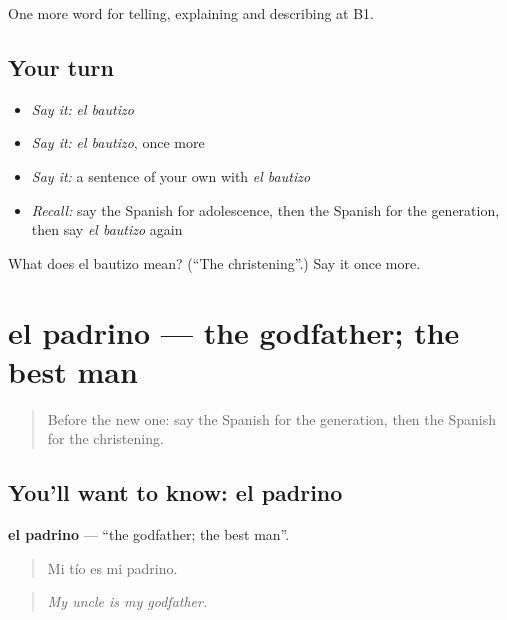 \begin{grammarlens}[title={What you've built}]
One more word for telling, explaining and describing at B1.
\end{grammarlens}

\subsection*{Your turn}
\begin{itemize}
\raggedright
  \item \emph{Say it:} \emph{el bautizo}
  \item \emph{Say it:} \emph{el bautizo}, once more
  \item \emph{Say it:} a sentence of your own with \emph{el bautizo}
  \item \emph{Recall:} say the Spanish for adolescence, then the Spanish for the generation, then say \emph{el bautizo} again
\end{itemize}

\begin{tcolorbox}[breakable,colback=teal!4,colframe=teal!35!black,title={Before you move on}]
What does el bautizo mean? (\textquotedblleft{}The christening\textquotedblright{}.) Say it once more.
\end{tcolorbox}
\section[el padrino]{el padrino — the godfather; the best man}

\label{lesson:ES-C546-padrino}



\begin{quote}
Before the new one: say the Spanish for the generation, then the Spanish for the christening.
\end{quote}

\subsection*{You'll want to know: el padrino}
\textbf{el padrino} — \textquotedblleft{}the godfather; the best man\textquotedblright{}.

\begin{quote}
Mi tío es mi padrino.
\end{quote}

\begin{quote}
\emph{My uncle is my godfather.}
\end{quote}

